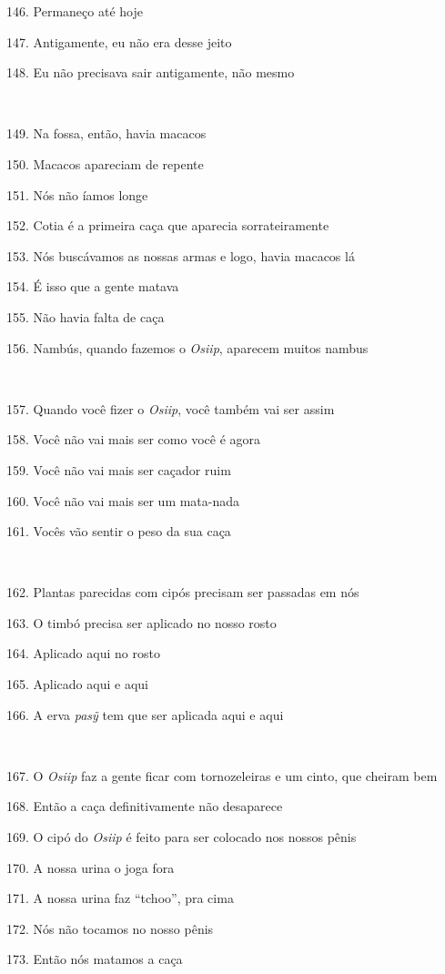 146. Permaneço até hoje

147. Antigamente, eu não era desse jeito

148. Eu não precisava sair antigamente, não mesmo

~

149. Na fossa, então, havia macacos

150. Macacos apareciam de repente

151. Nós não íamos longe

152. Cotia é a primeira caça que aparecia sorrateiramente

153. Nós buscávamos as nossas armas e logo, havia macacos lá

154. É isso que a gente matava

155. Não havia falta de caça

156. Nambús, quando fazemos o \emph{Osiip}, aparecem muitos nambus

~

157. Quando você fizer o \emph{Osiip}, você também vai ser assim

158. Você não vai mais ser como você é agora

159. Você não vai mais ser caçador ruim

160. Você não vai mais ser um mata-nada

161. Vocês vão sentir o peso da sua caça

~

162. Plantas parecidas com cipós precisam ser passadas em nós

163. O timbó precisa ser aplicado no nosso rosto

164. Aplicado aqui no rosto

165. Aplicado aqui e aqui

166. A erva \emph{pasỹ} tem que ser aplicada aqui e aqui

~

167. O \emph{Osiip} faz a gente ficar com tornozeleiras e um cinto, que
cheiram bem

168. Então a caça definitivamente não desaparece

169. O cipó do \emph{Osiip} é feito para ser colocado nos nossos pênis

170. A nossa urina o joga fora

171. A nossa urina faz ``tchoo'', pra cima

172. Nós não tocamos no nosso pênis

173. Então nós matamos a caça

~

